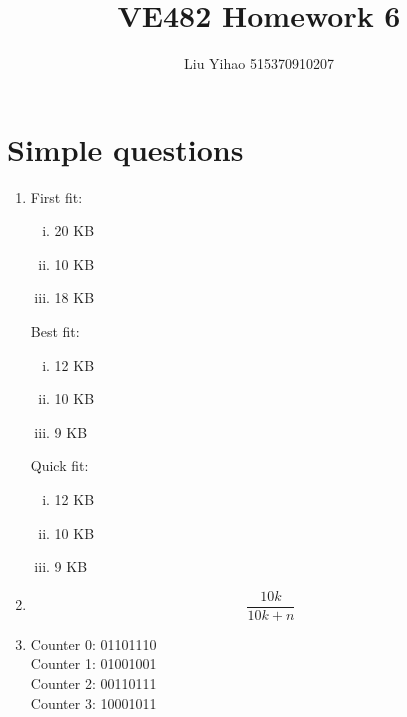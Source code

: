 \documentclass{article}
\title{VE482 Homework 6}
\author{Liu Yihao 515370910207}
\date{}
\begin{document}
\maketitle

\section{Simple questions}
\begin{enumerate}
\item 
First fit:
\begin{enumerate}[(i)]
\item 20 KB
\item 10 KB
\item 18 KB
\end{enumerate}
Best fit:
\begin{enumerate}[(i)]
\item 12 KB
\item 10 KB
\item 9 KB
\end{enumerate}
Quick fit:
\begin{enumerate}[(i)]
\item 12 KB
\item 10 KB
\item 9 KB
\end{enumerate}
\item
$$\frac{10k}{10k+n}$$
\item
Counter 0: 01101110 \\
Counter 1: 01001001 \\
Counter 2: 00110111 \\
Counter 3: 10001011
\end{enumerate}
\end{document}

